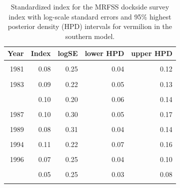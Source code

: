 \documentclass[11pt,
  english,
]{article}
\begin{document}
\begin{table}

\caption{\label{tab:tab-index-mrfss}Standardized index for the MRFSS dockside survey index with log-scale standard errors and 95\% highest
       posterior density (HPD) intervals for vermilion in the southern model.}
\centering
\begin{tabular}[t]{rrrrr}
\toprule
Year & Index & logSE & lower HPD & upper HPD\\
\midrule
\cellcolor{gray!6}{1980} & \cellcolor{gray!6}{0.03} & \cellcolor{gray!6}{0.30} & \cellcolor{gray!6}{0.02} & \cellcolor{gray!6}{0.05}\\
1981 & 0.08 & 0.25 & 0.04 & 0.12\\
\cellcolor{gray!6}{1982} & \cellcolor{gray!6}{0.06} & \cellcolor{gray!6}{0.25} & \cellcolor{gray!6}{0.03} & \cellcolor{gray!6}{0.09}\\
1983 & 0.09 & 0.22 & 0.05 & 0.13\\
\cellcolor{gray!6}{1984} & \cellcolor{gray!6}{0.12} & \cellcolor{gray!6}{0.17} & \cellcolor{gray!6}{0.08} & \cellcolor{gray!6}{0.16}\\
\addlinespace
1985 & 0.10 & 0.20 & 0.06 & 0.14\\
\cellcolor{gray!6}{1986} & \cellcolor{gray!6}{0.18} & \cellcolor{gray!6}{0.18} & \cellcolor{gray!6}{0.13} & \cellcolor{gray!6}{0.26}\\
1987 & 0.10 & 0.30 & 0.05 & 0.17\\
\cellcolor{gray!6}{1988} & \cellcolor{gray!6}{0.16} & \cellcolor{gray!6}{0.22} & \cellcolor{gray!6}{0.10} & \cellcolor{gray!6}{0.25}\\
1989 & 0.08 & 0.31 & 0.04 & 0.14\\
\addlinespace
\cellcolor{gray!6}{1993} & \cellcolor{gray!6}{0.06} & \cellcolor{gray!6}{0.28} & \cellcolor{gray!6}{0.03} & \cellcolor{gray!6}{0.10}\\
1994 & 0.11 & 0.22 & 0.07 & 0.16\\
\cellcolor{gray!6}{1995} & \cellcolor{gray!6}{0.04} & \cellcolor{gray!6}{0.42} & \cellcolor{gray!6}{0.02} & \cellcolor{gray!6}{0.09}\\
1996 & 0.07 & 0.25 & 0.04 & 0.10\\
\cellcolor{gray!6}{1997} & \cellcolor{gray!6}{0.04} & \cellcolor{gray!6}{0.46} & \cellcolor{gray!6}{0.02} & \cellcolor{gray!6}{0.09}\\
\addlinespace
1998 & 0.05 & 0.25 & 0.03 & 0.08\\
\cellcolor{gray!6}{1999} & \cellcolor{gray!6}{0.15} & \cellcolor{gray!6}{0.17} & \cellcolor{gray!6}{0.10} & \cellcolor{gray!6}{0.21}\\
\bottomrule
\end{tabular}
\end{table}
\end{document}
